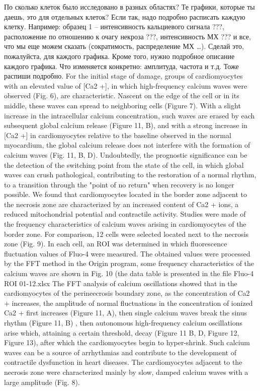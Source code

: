 \documentclass[a4paper,12pt]{article}
\begin{document}
По сколько клеток было исследовано в разных областях? Те графики, которые ты даешь, это для отдельных клеток? Если так, надо подробно расписать каждую клетку. Например: образец 1 – интенсивность кальциевого сигнала ???, расположение по отношению к очагу некроза ???, интенсивность МХ ??? и все, что мы еще можем сказать (сократимость, распределение МХ …). Сделай это, пожалуйста, для каждого графика.
Кроме того, нужно подробное описание каждого графика. Что изменяется конкретно: амплитуда, частота и т.д. Тоже распиши подробно.
For the initial stage of damage, groups of cardiomyocytes with an elevated value of [Ca2 +], in which high-frequency calcium waves were observed (Fig. 6), are characteristic. Nascent on the edge of the cell or in its middle, these waves can spread to neighboring cells (Figure 7). With a slight increase in the intracellular calcium concentration, such waves are erased by each subsequent global calcium release (Figure 11, B), and with a strong increase in [Ca2 +] in cardiomyocytes relative to the baseline observed in the normal myocardium, the global calcium release does not interfere with the formation of calcium waves (Fig. 11, B, D). Undoubtedly, the prognostic significance can be the detection of the switching point from the state of the cell, in which global waves can crush pathological, contributing to the restoration of a normal rhythm, to a transition through the "point of no return" when recovery is no longer possible.
We found that cardiomyocytes located in the border zone adjacent to the necrosis zone are characterized by an increased content of Ca2 + ions, a reduced mitochondrial potential and contractile activity. Studies were made of the frequency characteristics of calcium waves arising in cardiomyocytes of the border zone. For comparison, 12 cells were selected located next to the necrosis zone (Fig. 9). In each cell, an ROI was determined in which fluorescence fluctuation values of Fluo-4 were measured. The obtained values were processed by the FFT method in the Origin program, some frequency characteristics of the calcium waves are shown in Fig. 10 (the data table is presented in the file Fluo-4 ROI 01-12.xlsx
The FFT analysis of calcium oscillations showed that in the cardiomyocytes of the perineecrosis boundary zone, as the concentration of Ca2 + increases, the amplitude of normal fluctuations in the concentration of ionized Ca2 + first increases (Figure 11, A), then single calcium waves break the sinus rhythm (Figure 11, B) ,
then autonomous high-frequency calcium oscillations arise which, attaining a certain threshold, decay (Figure 11 B, D, Figure 12, Figure 13), after which the cardiomyocytes begin to hyper-shrink. Such calcium waves can be a source of arrhythmias and contribute to the development of contractile dysfunction in heart diseases.
The cardiomyocytes adjacent to the necrosis zone were characterized mainly by slow, damped calcium waves with a large amplitude (Fig. 8).
\end{document}
